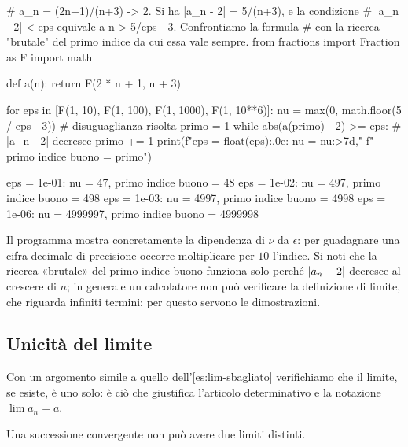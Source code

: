 \begin{python}
# a_n = (2n+1)/(n+3) -> 2. Si ha |a_n - 2| = 5/(n+3), e la condizione
# |a_n - 2| < eps equivale a n > 5/eps - 3. Confrontiamo la formula
# con la ricerca "brutale" del primo indice da cui essa vale sempre.
from fractions import Fraction as F
import math

def a(n):
    return F(2 * n + 1, n + 3)

for eps in [F(1, 10), F(1, 100), F(1, 1000), F(1, 10**6)]:
    nu = max(0, math.floor(5 / eps - 3))   # disuguaglianza risolta
    primo = 1
    while abs(a(primo) - 2) >= eps:        # |a_n - 2| decresce
        primo += 1
    print(f"eps = {float(eps):.0e}:  nu = {nu:>7d},"
          f"  primo indice buono = {primo}")
\end{python}
\begin{risultato}
eps = 1e-01:  nu =      47,  primo indice buono = 48
eps = 1e-02:  nu =     497,  primo indice buono = 498
eps = 1e-03:  nu =    4997,  primo indice buono = 4998
eps = 1e-06:  nu = 4999997,  primo indice buono = 4999998
\end{risultato}

Il programma mostra concretamente la dipendenza di $\nu$ da $\epsilon$: per guadagnare
una cifra decimale di precisione occorre moltiplicare per $10$ l'indice. Si noti che la
ricerca «brutale» del primo indice buono funziona solo perché $\lvert a_{n}-2\rvert$ decresce al
crescere di $n$; in generale un calcolatore non può verificare la definizione di limite,
che riguarda infiniti termini: per questo servono le dimostrazioni.

\subsection{Unicità del limite}

Con un argomento simile a quello dell'\cref{es:lim-sbagliato} verifichiamo che il limite,
se esiste, è uno solo: è ciò che giustifica l'articolo determinativo e la notazione
$\lim a_{n}=a$.

\begin{teorema}\label{teo:unicita-limite}
Una successione convergente non può avere due limiti distinti.
\end{teorema}

\begin{schema}
\end{schema}


